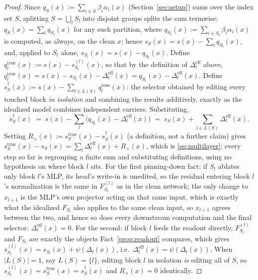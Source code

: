 \documentclass[11pt,a4paper]{article}
\begin{document}
\begin{proof}
Since $q_S(x):=\sum_{i\in S}\beta_i\alpha_i(x)$ (Section~\ref{sec:setup})
sums over the index set $S$, splitting $S=\bigcup_lS_l$ into disjoint groups
splits the sum termwise: $q_S(x)=\sum_l q_{S_l}(x)$ for any such partition,
where $q_{S_l}(x):=\sum_{i\in S_l}\beta_i\alpha_i(x)$ is computed, as always,
on the clean $x$; hence $s_S(x)=s(x)-\sum_l q_{S_l}(x)$, and, applied to
$S_l$ alone, $s_{S_l}(x)=s(x)-q_{S_l}(x)$. Define
$q_l^{\mathrm{true}}(x):=s(x)-s_{S_l}^{(l)}(x)$, so that by the definition of
$\Delta_l^{\mathrm{eff}}$ above,
$q_l^{\mathrm{true}}(x) = s(x)-s_{S_l}(x)-\Delta_l^{\mathrm{eff}}(x)
= q_{S_l}(x)-\Delta_l^{\mathrm{eff}}(x)$.
Define $s_S^\dagger(x):=s(x)-\sum_{l\in L(S)}q_l^{\mathrm{true}}(x)$: the
selector obtained by editing every touched block \emph{in isolation} and
combining the results additively, exactly as the idealized model combines
independent carriers. Substituting,
\[
s_S^\dagger(x) \;=\; s(x)-\sum_l\bigl(q_{S_l}(x)-\Delta_l^{\mathrm{eff}}(x)\bigr)
\;=\; s_S(x) + \sum_{l\in L(S)}\Delta_l^{\mathrm{eff}}(x).
\]
Setting $R_\times(x):=s_S^{\mathrm{true}}(x)-s_S^\dagger(x)$ (a
definition, not a further claim) gives
$s_S^{\mathrm{true}}(x)-s_S(x) = \sum_l\Delta_l^{\mathrm{eff}}(x) + R_\times(x)$,
which is \eqref{eq:multilayer}; every step so far is regrouping a finite sum
and substituting definitions, using no hypothesis on where block $l$ sits.
For the first pinning-down fact: if $S_l$ ablates only block $l$'s MLP, its
head's write-in is unedited, so the residual entering block $l$'s
normalization is the same in $F_{S_l}^{(l)}$ as in the clean network; the
only change to $x_{l+1}$ is the MLP's own projector acting on that same
input, which is exactly what the idealized $F_{S_l}$ also applies to the same
clean input, so $x_{l+1}$ agrees between the two, and hence so does every
downstream computation and the final selector: $\Delta_l^{\mathrm{eff}}(x)=0$.
For the second: if block $l$ feeds the readout directly, $F_{S_l}^{(l)}$ and
$F_{S_l}$ are exactly the objects Fact~\ref{prop:readout} compares,
which gives $s_{S_l}^{(l)}(x)=s_{S_l}(x)+\psi(\Delta_l(x))$, i.e.\
$\Delta_l^{\mathrm{eff}}(x)=\psi(\Delta_l(x))$. When $|L(S)|=1$, say
$L(S)=\{l\}$, editing block $l$ in isolation \emph{is} editing all of $S$, so
$s_{S_l}^{(l)}(x)=s_S^{\mathrm{true}}(x)=s_S^\dagger(x)$ and $R_\times(x)=0$
identically.
\end{proof}
\end{document}
